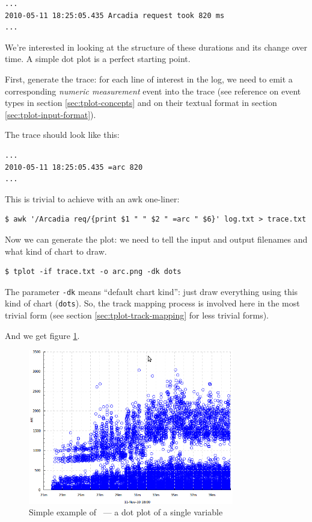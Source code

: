 \documentclass{article}
\begin{document}
\begin{verbatim}
...
2010-05-11 18:25:05.435 Arcadia request took 820 ms
...
\end{verbatim}

We're interested in looking at the structure of these durations and its change over time. A simple dot plot is a perfect starting point.

First, generate the trace: for each line of interest in the log, we need to emit a corresponding \emph{numeric measurement} event into the trace (see reference on event types in section \ref{sec:tplot-concepts} and on their textual format in section \ref{sec:tplot-input-format}).

The trace should look like this:
\begin{verbatim}
...
2010-05-11 18:25:05.435 =arc 820
...
\end{verbatim}

This is trivial to achieve with an awk one-liner:
\begin{verbatim}
$ awk '/Arcadia req/{print $1 " " $2 " =arc " $6}' log.txt > trace.txt
\end{verbatim}

Now we can generate the plot: we need to tell \timeplot{} the input and output filenames and what kind of chart to draw.
\begin{verbatim}
$ tplot -if trace.txt -o arc.png -dk dots
\end{verbatim}

The parameter \verb|-dk| means ``default chart kind'': just draw everything using this kind of chart (\verb|dots|). So, the track mapping process is involved here in the most trivial form (see section \ref{sec:tplot-track-mapping} for less trivial forms).

And we get figure \ref{fig:tplot-simple-example}.

\begin{figure}[h]
\center
\includegraphics[width=0.8\textwidth]{pics/tplot/dots.png}
\caption{Simple example of \timeplot{}~--- a dot plot of a single variable}
\label{fig:tplot-simple-example}
\end{figure}
\end{document}

